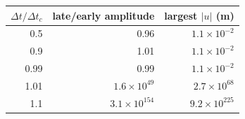 \begin{tabular}{rrr}
\toprule
$\Delta t/\Delta t_c$ & late/early amplitude & largest $|u|$ (m) \\
\midrule
0.5 & 0.96 & $1.1\times10^{-2}$ \\
0.9 & 1.01 & $1.1\times10^{-2}$ \\
0.99 & 0.99 & $1.1\times10^{-2}$ \\
1.01 & $1.6\times10^{49}$ & $2.7\times10^{68}$ \\
1.1 & $3.1\times10^{154}$ & $9.2\times10^{225}$ \\
\bottomrule
\end{tabular}

